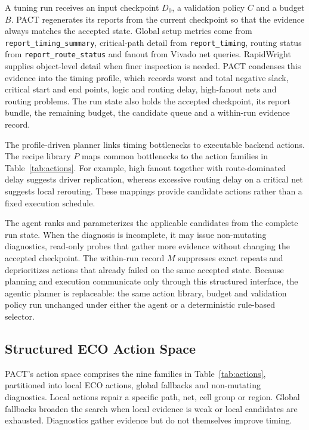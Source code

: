 \documentclass[conference]{IEEEtran}
\begin{document}
A tuning run receives an input checkpoint $D_0$, a validation
policy $C$ and a budget $B$. PACT regenerates its reports from the
current checkpoint so that the evidence always matches the accepted
state. Global setup metrics come from \texttt{report\_timing\_summary},
critical-path detail from \texttt{report\_timing}, routing status from
\texttt{report\_route\_status} and fanout from Vivado net queries.
RapidWright supplies object-level detail when finer inspection is
needed. PACT condenses this evidence into the timing profile, which
records worst and total negative slack, critical start and end points,
logic and routing delay, high-fanout nets and routing problems. The run
state also
holds the accepted checkpoint, its report bundle, the remaining budget,
the candidate queue and a within-run evidence record.

The profile-driven planner links timing bottlenecks to executable
backend actions. The recipe library $P$ maps common bottlenecks to the
action families in Table~\ref{tab:actions}. For example, high fanout
together with route-dominated delay suggests driver replication,
whereas excessive routing delay on a critical net suggests local
rerouting. These mappings provide candidate actions rather than a
fixed execution schedule.

The agent ranks and parameterizes the applicable candidates from
the complete run state. When the diagnosis is incomplete, it may issue
non-mutating diagnostics, read-only probes that gather more evidence
without changing the accepted checkpoint. The within-run record $M$
suppresses exact repeats and deprioritizes actions that already failed
on the same accepted state. Because planning and execution communicate
only through this structured interface, the agentic planner is
replaceable: the same action library, budget and validation policy run
unchanged under either the agent or a deterministic rule-based
selector.

\subsection{Structured ECO Action Space}
\label{sec:action-library}

PACT's action space comprises the nine families in
Table~\ref{tab:actions}, partitioned into local ECO actions, global
fallbacks and non-mutating diagnostics. Local actions repair a specific
path, net, cell group or region. Global fallbacks broaden the search
when local evidence is weak or local candidates are exhausted.
Diagnostics gather evidence but do not themselves improve timing.
\end{document}
